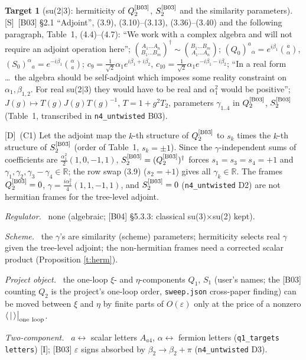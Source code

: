 \documentclass[11pt]{article}
\theoremstyle{definition}
\newtheorem{target}{Target}
\newcommand{\Sl}{\textup{[S]}}
\newcommand{\Dl}{\textup{[D]}}
\newcommand{\Il}{\textup{[I]}}
\newcommand{\oneloop}{\big|_{\rm one\ loop}}
\newcommand{\fld}[1]{\par\textit{#1.}\ }
\begin{document}
\begin{target}[su(2$|$3): hermiticity of $Q_2^{\rm[B03]}$, $S_2^{\rm[B03]}$ and the similarity parameters]\label{t:b03}
\Sl\ [B03] \S2.1 ``Adjoint'', (3.9), (3.10)--(3.13), (3.36)--(3.40) and the following paragraph, Table~1, (4.4)--(4.7): ``We work with a complex algebra and will not require an adjoint operation here''; $\binom{A_1\dots A_n}{B_1\dots B_m}^\dagger\sim\binom{B_1\dots B_m}{A_1\dots A_n}$; $(Q_0)^a{}_\alpha=e^{i\beta_1}\binom a\alpha$, $(S_0)^\alpha{}_a=e^{-i\beta_1}\binom\alpha a$; $c_9=\tfrac1{\sqrt2}\alpha_1e^{i\beta_1+i\beta_2}$, $c_{10}=\tfrac1{\sqrt2}\alpha_1e^{-i\beta_1-i\beta_2}$; ``In a real form \dots\ the algebra should be self-adjoint which imposes some reality constraint on $\alpha_1,\beta_{1,2}$. For real su(2$|$3) they would have to be real and $\alpha_1^2$ would be positive''; $J(g)\mapsto T(g)J(g)T(g)^{-1}$, $T=1+g^2T_2$, parameters $\gamma_{1..4}$ in $Q_2^{\rm[B03]}$, $S_2^{\rm[B03]}$ (Table~1, transcribed in \texttt{n4\_untwisted} B03).
\par\Dl\ (C1) Let the adjoint map the $k$-th structure of $Q_2^{\rm[B03]}$ to $s_k$ times the $k$-th structure of $S_2^{\rm[B03]}$ (order of Table~1, $s_k=\pm1$). Since the $\gamma$-independent sums of coefficients are $\tfrac{\alpha_1^2}2(1,0,-1,1)$, $S_2^{\rm[B03]}=(Q_2^{\rm[B03]})^\dagger$ forces $s_1=s_3=s_4=+1$ and $\gamma_1,\gamma_2,\gamma_3-\gamma_4\in\mathbb R$; the row swap (3.9) ($s_2=+1$) gives all $\gamma_k\in\mathbb R$. The frames $Q_2^{\rm[B03]}=0$, $\gamma=\tfrac{i\alpha_1^2}4(1,1,-1,1)$, and $S_2^{\rm[B03]}=0$ (\texttt{n4\_untwisted} D2) are not hermitian frames for the tree-level adjoint.
\fld{Regulator} none (algebraic; [B04] \S5.3.3: classical su(3)$\times$su(2) kept).
\fld{Scheme} the $\gamma$'s are similarity (scheme) parameters; hermiticity selects real $\gamma$ given the tree-level adjoint; the non-hermitian frames need a corrected scalar product (Proposition \ref{t:herm}).
\fld{Project object} the one-loop $\xi$- and $\eta$-components $Q_1$, $S_1$ (user's names; the [B03] counting $Q_2$ is the project's one-loop order, \texttt{sweep.json} cross-paper finding) can be moved between $\xi$ and $\eta$ by finite parts of $O(\varepsilon)$ only at the price of a nonzero $\langle\,|\,\rangle\oneloop$.
\fld{Two-component} $a\leftrightarrow$ scalar letters $A_{a4}$, $\alpha\leftrightarrow$ fermion letters (\texttt{q1\_targets} \texttt{letters}) \Il; [B03] $\varepsilon$ signs absorbed by $\beta_2\to\beta_2+\pi$ (\texttt{n4\_untwisted} D3).
\end{target}
\end{document}
